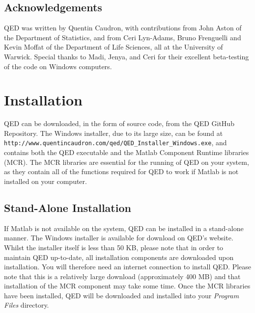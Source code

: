 \documentclass[a4paper,11pt]{article}
\begin{document}
\subsection{Acknowledgements}

QED was written by Quentin Caudron, with contributions from John Aston of the Department of Statistics, and from Ceri Lyn-Adams, Bruno Frenguelli and Kevin Moffat of the Department of Life Sciences, all at the University of Warwick. Special thanks to Madi, Jenya, and Ceri for their excellent beta-testing of the code on Windows computers.







\newpage
\section{Installation}

QED can be downloaded, in the form of source code, from the QED GitHub Repository. The Windows installer, due to its large size, can be found at \texttt{http://www.quentincaudron.com/qed/QED\_Installer\_Windows.exe}, and contains both the QED executable and the Matlab Component Runtime libraries (MCR). The MCR libraries are essential for the running of QED on your system, as they contain all of the functions required for QED to work if Matlab is not installed on your computer.


\subsection{Stand-Alone Installation}

If Matlab is not available on the system, QED can be installed in a stand-alone manner. The Windows installer is available for download on QED's website. Whilst the installer itself is less than 50 KB, please note that in order to maintain QED up-to-date, all installation components are downloaded upon installation. You will therefore need an internet connection to install QED. Please note that this is a relatively large download (approximately 400 MB) and that installation of the MCR component may take some time. Once the MCR libraries have been installed, QED will be downloaded and installed into your \textit{Program Files} directory.
\end{document}
